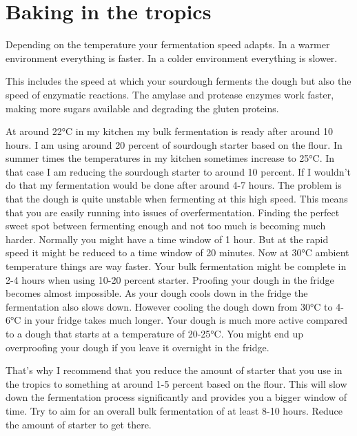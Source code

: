 \section{Baking in the tropics}

Depending on the temperature your fermentation speed adapts.
In a warmer environment everything is faster. In a colder
environment everything is slower.

This includes the speed at which your sourdough ferments
the dough but also the speed of enzymatic reactions. The
amylase and protease enzymes work faster, making more
sugars available and degrading the gluten proteins.

At around 22°C in my kitchen my bulk fermentation is ready
after around 10 hours. I am using around 20 percent of sourdough
starter based on the flour. In summer times the temperatures
in my kitchen sometimes increase to 25°C. In that case
I am reducing the sourdough starter to around 10 percent.
If I wouldn't do that my fermentation would be done after
around 4-7 hours. The problem is that the dough is quite
unstable when fermenting at this high speed. This means
that you are easily running into issues of overfermentation.
Finding the perfect sweet spot between fermenting enough
and not too much is becoming much harder. Normally you might
have a time window of 1 hour. But at the rapid speed it
might be reduced to a time window of 20 minutes. Now at
30°C ambient temperature things are way faster. Your bulk
fermentation might be complete in 2-4 hours when using
10-20 percent starter. Proofing your dough in the fridge
becomes almost impossible. As your dough cools down in the
fridge the fermentation also slows down. However cooling the
dough down from 30°C to 4-6°C in your fridge takes much
longer. Your dough is much more active compared to a dough
that starts at a temperature of 20-25°C. You might
end up overproofing your dough if you leave it overnight
in the fridge.

That's why I recommend that you reduce the amount of starter
that you use in the tropics to something at around 1-5 percent
based on the flour. This will slow down the fermentation
process significantly and provides you a bigger window
of time. Try to aim for an overall bulk fermentation of at
least 8-10 hours. Reduce the amount of starter to get there.

